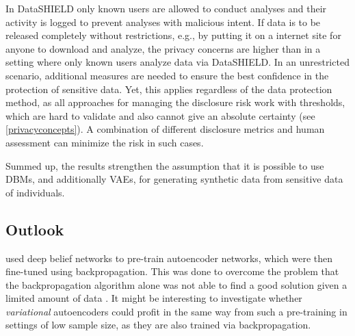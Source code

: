 \documentclass[12pt]{article}
\begin{document}
In DataSHIELD only known users are allowed to conduct analyses and their activity is logged to prevent analyses with malicious intent.
If data is to be released completely without restrictions, e.g., by putting it on a internet site for anyone to download and analyze, the privacy concerns are higher than in a setting where only known users analyze data via DataSHIELD.
In an unrestricted scenario, additional measures are needed to ensure the best confidence in the protection of sensitive data.
Yet, this applies regardless of the data protection method, as all approaches for managing the disclosure risk work with thresholds, which are hard to validate and also cannot give an absolute certainty (see \ref{privacyconcepts}).
A combination of different disclosure metrics and human assessment can minimize the risk in such cases.

Summed up, the results strengthen the assumption that it is possible to use DBMs, and additionally VAEs, for generating synthetic data from sensitive data of individuals.





\subsection{Outlook}

\cite{hinton_reducing_2006} used deep belief networks to pre-train autoencoder networks, which were then fine-tuned using backpropagation.
This was done to overcome the problem that the backpropagation algorithm alone was not able to find a good solution given a limited amount of data \citep{lecun_deep_learning_2015}.
It might be interesting to investigate whether {\em variational} autoencoders could profit in the same way from such a pre-training in settings of low sample size, as they are also trained via backpropagation. 
\end{document}
